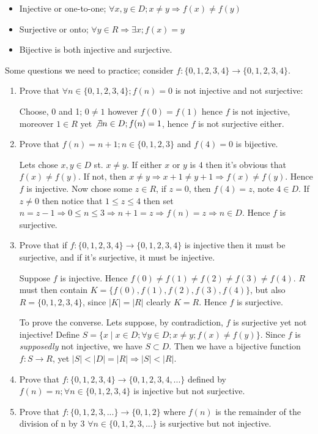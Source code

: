 \documentclass{article}
\begin{document}
\begin{itemize}
				\item Injective or one-to-one; $\forall x,y \in D; x \neq y \Rightarrow f(x) \neq f(y)$
				\item Surjective or onto; $\forall y \in R \Rightarrow \exists x; f(x) = y$
				\item Bijective is both injective and surjective.
\end{itemize}
Some questions we need to practice; consider $f: \{0,1,2,3,4\} \rightarrow \{0,1,2,3,4\}$.
\begin{enumerate}
				\item Prove that $\forall n \in \{0,1,2,3,4\}; f(n) = 0$ is not injective and not surjective:

								Choose, 0 and 1; $0 \neq 1$ however $f(0)=f(1)$ hence $f$ is not injective, moreover $1 \in R$ yet $\not\exists n \in D; f(n) = 1$, hence $f$ is not surjective either.

				\item Prove that $f(n) = n + 1; n \in \{0,1,2,3\}$ and $f(4) = 0$ is bijective.

								Lets chose $x,y \in D$ st. $x\neq y$. If either $x$ or $y$ is $4$ then it's obvious that $f(x) \neq f(y)$. If not, then
								\begin{math}
												x \neq y \Rightarrow x + 1 \neq y + 1 \Rightarrow f(x) \neq f(y)
								\end{math}. Hence $f$ is injective.
								Now chose some $z \in R$, if $z=0$, then $f(4) = z$, note $4 \in D$. If $z \neq 0$ then notice that $1 \leq z \leq 4$ then set $n = z - 1 \Rightarrow 0 \leq n \leq 3 \Rightarrow n + 1 = z \Rightarrow f(n) = z \Rightarrow n \in D$. Hence $f$ is surjective.
								

				\item Prove that if $f: \{0,1,2,3,4\} \rightarrow \{0,1,2,3,4\}$ is injective then it must be surjective, and if it's surjective, it must be injective.

\subitem Suppose $f$ is injective. Hence $f(0) \neq f(1) \neq f(2) \neq f(3) \neq f(4)$. $R$ must then contain $K = \{f(0),f(1),f(2),f(3),f(4)\}$, but also $R = \{0,1,2,3,4\}$, since $|K| = |R|$ clearly $K=R$. Hence $f$ is surjective.
								
\subitem To prove the converse. Lets suppose, by contradiction, $f$ is surjective yet not injective! Define $S = \{x \mid x \in D; \forall y \in D; x \neq y; f(x) \neq f(y)\}$. Since $f$ is \emph{supposedly} not injective, we have $S \subset D$. Then we have a bijective function $f: S \rightarrow R$, yet $|S| < |D| = |R| \Rightarrow |S| < |R|$.

				\item Prove that $f: \{0,1,2,3,4\} \rightarrow \{0,1,2,3,4,...\}$ defined by $f(n) = n; \forall n \in \{0,1,2,3,4\}$ is injective but not surjective.

				\item Prove that $f: \{0,1,2,3,...\} \rightarrow \{0,1,2\}$ where $f(n)$ is the remainder of the division of n  by 3 $\forall n \in \{0,1,2,3,...\}$ is surjective but not injective.

\end{enumerate}
\end{document}
